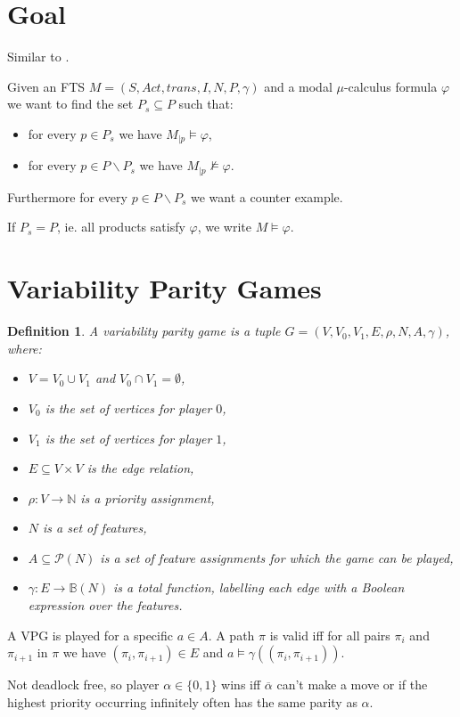 \documentclass[]{article}
\newtheorem{definition}{Definition}[section]
\begin{document}
\section{Goal}
Similar to \cite{inproceedings}.

Given an FTS $M = (S, Act, trans, I, N, P, \gamma)$ and a modal $\mu$-calculus formula $\varphi$ we want to find the set $P_s \subseteq P$ such that:
\begin{itemize}
	\item for every $p \in P_s$ we have $M_{|p} \models \varphi$,
	\item for every $p \in P \backslash P_s$ we have $M_{|p} \not\models \varphi$.
\end{itemize}
Furthermore for every $p \in P \backslash P_s$ we want a counter example.

If $P_s = P$, ie. all products satisfy $\varphi$, we write $M \models \varphi$.

\section{Variability Parity Games}
\begin{definition}
	A variability parity game is a tuple $G = (V,V_0, V_1, E, \rho, N, A, \gamma)$, where:
	\begin{itemize}
		\item $V = V_0 \cup V_1$ and $V_0 \cap V_1 = \emptyset$,
		\item $V_0$ is the set of vertices for player $0$,
		\item $V_1$ is the set of vertices for player $1$, 
		\item $E \subseteq V \times V$ is the edge relation,
		\item $\rho :  V \rightarrow \mathbb{N}$ is a priority assignment,
		\item $N$ is a set of features,
		\item $A \subseteq \mathcal{P}(N)$ is a set of feature assignments for which the game can be played,
		\item $\gamma : E \rightarrow \mathbb{B}(N)$ is a total function, labelling each edge with a Boolean expression over the features.
	\end{itemize}
\end{definition}
A VPG is played for a specific $a \in A$. A path $\pi$ is valid iff for all pairs $\pi_i$ and $\pi_{i+1}$ in $\pi$ we have $(\pi_i, \pi_{i+1}) \in E$ and $a \models \gamma((\pi_i, \pi_{i+1}))$.

Not deadlock free, so player $\alpha \in \{0,1\}$ wins iff $\overline{\alpha}$ can't make a move or if the highest priority occurring infinitely often has the same parity as $\alpha$.
\end{document}
